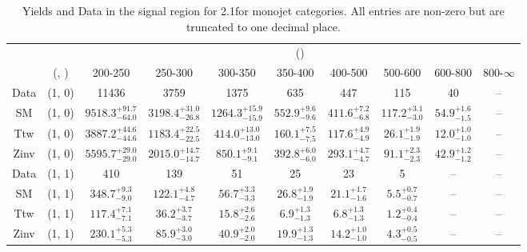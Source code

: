 \begin{table}[h!]
\tiny
\centering
\caption{Yields and Data in the signal region for 2.1\ifb for monojet categories. All entries are non-zero but are truncated to one decimal place.\label{tab:yieldsall_sig_comb_mono}}
\begin{tabular}
{cccccccccc}
	\hline\hline
	&	& \multicolumn{8}{c}{\scalht (\gev)}\\ 
	&	 (\njet, \nb) & 200-250 & 250-300 & 300-350 & 350-400 & 400-500 & 500-600 & 600-800 & 800-$\infty$ \\ [0.8ex] 
\hline
	Data & (1, 0) & 11436 & 3759 & 1375 & 635 & 447 & 115 & 40 & -- \\[0.5ex] 
	SM & (1, 0) & $9518.3^{+ 91.7 }_{- 64.0 }$ & $3198.4^{+ 31.0 }_{- 26.8 }$ & $1264.3^{+ 15.9 }_{- 15.9 }$ & $552.9^{+ 9.6 }_{- 9.6 }$ & $411.6^{+ 7.2 }_{- 6.8 }$ & $117.2^{+ 3.1 }_{- 3.0 }$ & $54.9^{+ 1.6 }_{- 1.5 }$ & -- \\[0.5ex] 
	Ttw & (1, 0) & $3887.2^{+ 44.6 }_{- 44.6 }$ & $1183.4^{+ 22.5 }_{- 22.5 }$ & $414.0^{+ 13.0 }_{- 13.0 }$ & $160.1^{+ 7.5 }_{- 7.5 }$ & $117.6^{+ 4.9 }_{- 4.9 }$ & $26.1^{+ 1.9 }_{- 1.9 }$ & $12.0^{+ 1.0 }_{- 1.0 }$ & -- \\[0.5ex] 
	Zinv & (1, 0) & $5595.7^{+ 29.0 }_{- 29.0 }$ & $2015.0^{+ 14.7 }_{- 14.7 }$ & $850.1^{+ 9.1 }_{- 9.1 }$ & $392.8^{+ 6.0 }_{- 6.0 }$ & $293.1^{+ 4.7 }_{- 4.7 }$ & $91.1^{+ 2.3 }_{- 2.3 }$ & $42.9^{+ 1.2 }_{- 1.2 }$ & -- \\[0.5ex] 
	Data & (1, 1) & 410 & 139 & 51 & 25 & 23 & 5 & -- & -- \\[0.5ex] 
	SM & (1, 1) & $348.7^{+ 9.3 }_{- 9.0 }$ & $122.1^{+ 4.8 }_{- 4.7 }$ & $56.7^{+ 3.3 }_{- 3.3 }$ & $26.8^{+ 1.9 }_{- 1.9 }$ & $21.1^{+ 1.7 }_{- 1.6 }$ & $5.5^{+ 0.7 }_{- 0.7 }$ & -- & -- \\[0.5ex] 
	Ttw & (1, 1) & $117.4^{+ 7.1 }_{- 7.1 }$ & $36.2^{+ 3.7 }_{- 3.7 }$ & $15.8^{+ 2.6 }_{- 2.6 }$ & $6.9^{+ 1.3 }_{- 1.3 }$ & $6.8^{+ 1.3 }_{- 1.3 }$ & $1.2^{+ 0.4 }_{- 0.4 }$ & -- & -- \\[0.5ex] 
	Zinv & (1, 1) & $230.1^{+ 5.3 }_{- 5.3 }$ & $85.9^{+ 3.0 }_{- 3.0 }$ & $40.9^{+ 2.0 }_{- 2.0 }$ & $19.9^{+ 1.3 }_{- 1.3 }$ & $14.2^{+ 1.0 }_{- 1.0 }$ & $4.3^{+ 0.5 }_{- 0.5 }$ & -- & -- \\[0.5ex] 
	\hline
	\hline
\end{tabular}
\end{table}
